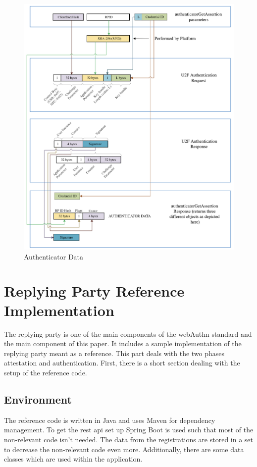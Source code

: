 \documentclass[a4paper, 11pt]{scrartcl}
\begin{document}
\begin{figure}[h]
  \includegraphics[width=16cm]{img/u2fcompat-getassertion.png}
  \centering
  \caption{Authenticator Data}
  \label{fig:authenticationMapping}
\end{figure}


\section{Replying Party Reference Implementation}
\label{sec:replying_party}

The replying party is one of the main components of the \gls{webAuthn} standard and the main component of this paper. It includes a sample implementation of the replying party meant as a reference. This part deals with the two phases attestation and authentication. First, there is a short section dealing with the setup of the reference code.

\subsection{Environment}

The reference code is written in Java and uses Maven for dependency management. To get the \gls{rest} \gls{api} set up Spring Boot is used such that most of the non-relevant code isn't needed. The data from the registrations are stored in a set to decrease the non-relevant code even more. Additionally, there are some data classes which are used within the application.
\end{document}
